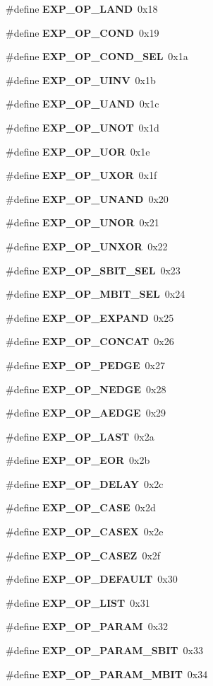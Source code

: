 \begin{CompactItemize}
\#define {\bf EXP\_\-OP\_\-LAND}\ 0x18
\item 
\#define {\bf EXP\_\-OP\_\-COND}\ 0x19
\item 
\#define {\bf EXP\_\-OP\_\-COND\_\-SEL}\ 0x1a
\item 
\#define {\bf EXP\_\-OP\_\-UINV}\ 0x1b
\item 
\#define {\bf EXP\_\-OP\_\-UAND}\ 0x1c
\item 
\#define {\bf EXP\_\-OP\_\-UNOT}\ 0x1d
\item 
\#define {\bf EXP\_\-OP\_\-UOR}\ 0x1e
\item 
\#define {\bf EXP\_\-OP\_\-UXOR}\ 0x1f
\item 
\#define {\bf EXP\_\-OP\_\-UNAND}\ 0x20
\item 
\#define {\bf EXP\_\-OP\_\-UNOR}\ 0x21
\item 
\#define {\bf EXP\_\-OP\_\-UNXOR}\ 0x22
\item 
\#define {\bf EXP\_\-OP\_\-SBIT\_\-SEL}\ 0x23
\item 
\#define {\bf EXP\_\-OP\_\-MBIT\_\-SEL}\ 0x24
\item 
\#define {\bf EXP\_\-OP\_\-EXPAND}\ 0x25
\item 
\#define {\bf EXP\_\-OP\_\-CONCAT}\ 0x26
\item 
\#define {\bf EXP\_\-OP\_\-PEDGE}\ 0x27
\item 
\#define {\bf EXP\_\-OP\_\-NEDGE}\ 0x28
\item 
\#define {\bf EXP\_\-OP\_\-AEDGE}\ 0x29
\item 
\#define {\bf EXP\_\-OP\_\-LAST}\ 0x2a
\item 
\#define {\bf EXP\_\-OP\_\-EOR}\ 0x2b
\item 
\#define {\bf EXP\_\-OP\_\-DELAY}\ 0x2c
\item 
\#define {\bf EXP\_\-OP\_\-CASE}\ 0x2d
\item 
\#define {\bf EXP\_\-OP\_\-CASEX}\ 0x2e
\item 
\#define {\bf EXP\_\-OP\_\-CASEZ}\ 0x2f
\item 
\#define {\bf EXP\_\-OP\_\-DEFAULT}\ 0x30
\item 
\#define {\bf EXP\_\-OP\_\-LIST}\ 0x31
\item 
\#define {\bf EXP\_\-OP\_\-PARAM}\ 0x32
\item 
\#define {\bf EXP\_\-OP\_\-PARAM\_\-SBIT}\ 0x33
\item 
\#define {\bf EXP\_\-OP\_\-PARAM\_\-MBIT}\ 0x34
\end{CompactItemize}


